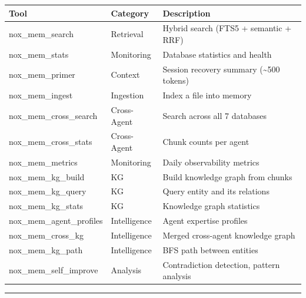 \documentclass[
]{article}
\newcounter{none} %
\begin{document}
{\def\LTcaptype{none} %
\begin{longtable}[]{@{}
  >{\raggedright\arraybackslash}p{}
  >{\raggedright\arraybackslash}p{}
  >{\raggedright\arraybackslash}p{}@{}}
\toprule\noalign{}
\begin{minipage}[b]{\linewidth}\raggedright
Tool
\end{minipage} & \begin{minipage}[b]{\linewidth}\raggedright
Category
\end{minipage} & \begin{minipage}[b]{\linewidth}\raggedright
Description
\end{minipage} \\
\midrule\noalign{}
\endhead
\bottomrule\noalign{}
\endlastfoot
nox\_mem\_search & Retrieval & Hybrid search (FTS5 + semantic + RRF) \\
nox\_mem\_stats & Monitoring & Database statistics and health \\
nox\_mem\_primer & Context & Session recovery summary
(\textasciitilde500 tokens) \\
nox\_mem\_ingest & Ingestion & Index a file into memory \\
nox\_mem\_cross\_search & Cross-Agent & Search across all 7 databases \\
nox\_mem\_cross\_stats & Cross-Agent & Chunk counts per agent \\
nox\_mem\_metrics & Monitoring & Daily observability metrics \\
nox\_mem\_kg\_build & KG & Build knowledge graph from chunks \\
nox\_mem\_kg\_query & KG & Query entity and its relations \\
nox\_mem\_kg\_stats & KG & Knowledge graph statistics \\
nox\_mem\_agent\_profiles & Intelligence & Agent expertise profiles \\
nox\_mem\_cross\_kg & Intelligence & Merged cross-agent knowledge
graph \\
nox\_mem\_kg\_path & Intelligence & BFS path between entities \\
nox\_mem\_self\_improve & Analysis & Contradiction detection, pattern
analysis \\
\end{longtable}
}

\begin{center}\rule{0.5\linewidth}{0.5pt}\end{center}
\end{document}
